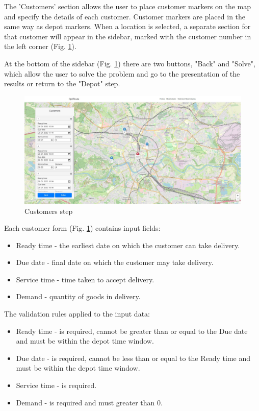 \documentclass[a4paper,twoside,12pt]{book}
\begin{document}
The 'Customers' section allows the user to place customer markers on the map and specify the details of each customer. Customer markers are placed in the same way as depot markers. When a location is selected, a separate section for that customer will appear in the sidebar, marked with the customer number in the left corner (Fig. \ref{fig:customers}). 



At the bottom of the sidebar (Fig. \ref{fig:customers}) there are two buttons, "Back" and "Solve", which allow the user to solve the problem and go to the presentation of the results or return to the "Depot" step.

\begin{figure}[H]
\centering
\includegraphics[width=\textwidth]{images/customers.jpg}
\caption{Customers step}
\label{fig:customers}
\end{figure}

Each customer form (Fig. \ref{fig:customers}) contains input fields:
\begin{itemize}
    \item Ready time - the earliest date on which the customer can take delivery.
    \item Due date - final date on which the customer may take delivery.
    \item Service time - time taken to accept delivery.
    \item Demand - quantity of goods in delivery.
\end{itemize}



The validation rules applied to the input data:
\begin{itemize}
    \item Ready time - is required, cannot be greater than or equal to the Due date and must be within the depot time window.
    \item Due date - is required, cannot be less than or equal to the Ready time and must be within the depot time window.
    \item Service time - is required.
    \item Demand - is required and must greater than 0.
\end{itemize}
\end{document}
